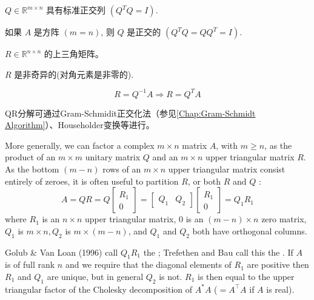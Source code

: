 \begin{corollary}
    $ Q \in \mathbb{R}^{m \times n} $ 具有标准正交列 $ \left(Q^{T} Q=I\right) $.
\end{corollary}

\begin{corollary}
    如果 $ A $ 是方阵 $ ( {m}= {n}) $, 则 $ Q $ 是正交的 $ \left(Q^{T} Q=Q Q^{T}=I\right) $.
\end{corollary}

\begin{corollary}
    $ R \in \mathbb{R}^{n \times n} $ 的上三角矩阵。
\end{corollary}

\begin{corollary}
     $ R $ 是非奇异的(对角元素是非零的).
\end{corollary}

\begin{corollary}
    \begin{equation} R=Q^{-1} A \Rightarrow R=Q^{T} A \end{equation}
\end{corollary}

QR分解可通过Gram-Schmidit正交化法（参见\ref{Chap:Gram-Schmidt Algorithm}）、Householder变换等进行。

More generally, we can factor a complex $ m \times n $ matrix $ A $, with $ m \geq n $, as the product of an $ m \times m $ unitary matrix $ Q $ and an $ m \times n $ upper triangular matrix $ R $. As the bottom $ (m-n) $ rows of an $ m \times n $ upper triangular matrix consist entirely of zeroes, it is often useful to partition $ R $, or both $ R $ and $ Q $ :
\begin{equation}
A=Q R=Q\left[\begin{array}{c}
R_{1} \\
0
\end{array}\right]=\left[\begin{array}{ll}
Q_{1} & Q_{2}
\end{array}\right]\left[\begin{array}{c}
R_{1} \\
0
\end{array}\right]=Q_{1} R_{1}
\end{equation}
where $ R_{1} $ is an $ n \times n $ upper triangular matrix, 0 is an $ (m-n) \times n $ zero matrix, $ Q_{1} $ is $ m \times n, Q_{2} $ is $ m \times(m-n) $, and $ Q_{1} $ and $ Q_{2} $ both have orthogonal columns.

Golub \& Van Loan (1996) call $ Q_{1} R_{1} $ the ; Trefethen and Bau call this the .   If $ A $ is of full rank $ n $ and we require that the diagonal elements of $ R_{1} $ are positive then $ R_{1} $ and $ Q_{1} $ are unique, but in general $ Q_{2} $ is not. $ R_{1} $ is then equal to the upper triangular factor of the Cholesky decomposition of $ A^{*} A$ ($=A^{\top} A $ if $ A $ is real).


